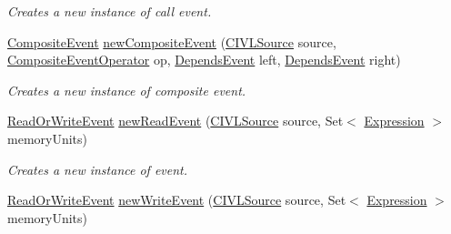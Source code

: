 \begin{DoxyCompactItemize}
\begin{DoxyCompactList}\small\item\em Creates a new instance of call event. \end{DoxyCompactList}\item 
\hyperlink{interfaceedu_1_1udel_1_1cis_1_1vsl_1_1civl_1_1model_1_1IF_1_1contract_1_1CompositeEvent}{Composite\+Event} \hyperlink{interfaceedu_1_1udel_1_1cis_1_1vsl_1_1civl_1_1model_1_1IF_1_1contract_1_1ContractFactory_a81adb81ca6477b71c7803a49618b7d1a}{new\+Composite\+Event} (\hyperlink{interfaceedu_1_1udel_1_1cis_1_1vsl_1_1civl_1_1model_1_1IF_1_1CIVLSource}{C\+I\+V\+L\+Source} source, \hyperlink{enumedu_1_1udel_1_1cis_1_1vsl_1_1civl_1_1model_1_1IF_1_1contract_1_1CompositeEvent_1_1CompositeEventOperator}{Composite\+Event\+Operator} op, \hyperlink{interfaceedu_1_1udel_1_1cis_1_1vsl_1_1civl_1_1model_1_1IF_1_1contract_1_1DependsEvent}{Depends\+Event} left, \hyperlink{interfaceedu_1_1udel_1_1cis_1_1vsl_1_1civl_1_1model_1_1IF_1_1contract_1_1DependsEvent}{Depends\+Event} right)
\begin{DoxyCompactList}\small\item\em Creates a new instance of composite event. \end{DoxyCompactList}\item 
\hyperlink{interfaceedu_1_1udel_1_1cis_1_1vsl_1_1civl_1_1model_1_1IF_1_1contract_1_1ReadOrWriteEvent}{Read\+Or\+Write\+Event} \hyperlink{interfaceedu_1_1udel_1_1cis_1_1vsl_1_1civl_1_1model_1_1IF_1_1contract_1_1ContractFactory_a8423595d464db94aa5d3fc1ede873666}{new\+Read\+Event} (\hyperlink{interfaceedu_1_1udel_1_1cis_1_1vsl_1_1civl_1_1model_1_1IF_1_1CIVLSource}{C\+I\+V\+L\+Source} source, Set$<$ \hyperlink{interfaceedu_1_1udel_1_1cis_1_1vsl_1_1civl_1_1model_1_1IF_1_1expression_1_1Expression}{Expression} $>$ memory\+Units)
\begin{DoxyCompactList}\small\item\em Creates a new instance of {\ttfamily } event. \end{DoxyCompactList}\item 
\hyperlink{interfaceedu_1_1udel_1_1cis_1_1vsl_1_1civl_1_1model_1_1IF_1_1contract_1_1ReadOrWriteEvent}{Read\+Or\+Write\+Event} \hyperlink{interfaceedu_1_1udel_1_1cis_1_1vsl_1_1civl_1_1model_1_1IF_1_1contract_1_1ContractFactory_a687a3be7d116a2f945d74b76187cfbc6}{new\+Write\+Event} (\hyperlink{interfaceedu_1_1udel_1_1cis_1_1vsl_1_1civl_1_1model_1_1IF_1_1CIVLSource}{C\+I\+V\+L\+Source} source, Set$<$ \hyperlink{interfaceedu_1_1udel_1_1cis_1_1vsl_1_1civl_1_1model_1_1IF_1_1expression_1_1Expression}{Expression} $>$ memory\+Units)

\end{DoxyCompactItemize}

